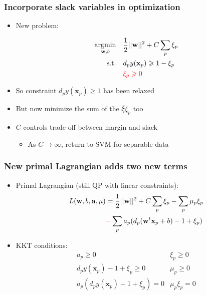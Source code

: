 \documentclass[12pt,notes,mathserif]{beamer}
\begin{document}
\begin{frame}[c]
\frametitle{Incorporate slack variables in optimization}
\begin{itemize}
\item New problem:

\begin{equation*}
	\begin{aligned}
		\mathop{\mathrm{argmin}}_{\mathbf{w},b} \quad &  \frac{1}{2} ||\mathbf{w}||^2+C\sum_p\xi_p \\ 
		\textrm{s.t.} \quad & d_py(\mathbf{x}_p)\geqslant{}1-\xi_p	 \\ 
		& {\color{red}{\xi_p \geqslant{} 0}} \\			
	\end{aligned}
\end{equation*}

\item So constraint $d_py(\mathbf{x}_p)\geqslant{}1$ has been relaxed
\item But now minimize the sum of the 𝜉$\xi_p$ too
\item $C$ controls trade-off between margin and slack
\begin{itemize}
\item As $C\to \infty$, return to SVM for separable data
\end{itemize}
\end{itemize}
\end{frame}

\begin{frame}[c]
\frametitle{New primal Lagrangian adds two new terms}
\begin{itemize}
\item Primal Lagrangian (still QP with linear constraints):
\begin{eqnarray*}
L(\mathbf{w},b,\mathbf{a},\mathbf{\mu}) &=\dfrac{1}{2}||\mathbf{w}||^2+C\sum_p\xi_p-\sum_p\mu_p\xi_p\\
\quad & {\color{red}{-}} \sum_pa_p(d_p(\mathbf{w}^t\mathbf{x}_p+b)-1+\xi_p)
\end{eqnarray*}
\item KKT conditions:
\[\begin{matrix}
a_p\geqslant{}0 &\xi_p\geqslant{}0\\
d_py(\mathbf{x}_p)-1+\xi_p\geqslant{}0&\mu_p\geqslant{}0\\
a_p(d_py(\mathbf{x}_p)-1+\xi_p)=0&\mu_p\xi_p=0
\end{matrix}\]
\end{itemize}
\end{frame}
\end{document}
